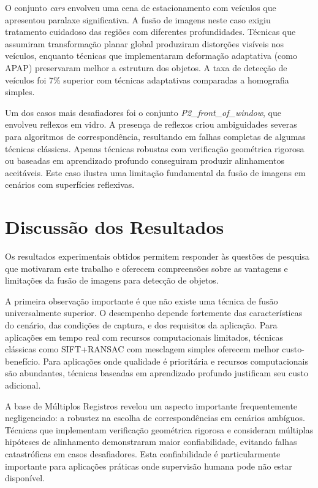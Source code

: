 O conjunto \textit{cars} envolveu uma cena de estacionamento com veículos que apresentou paralaxe significativa. A fusão de imagens neste caso exigiu tratamento cuidadoso das regiões com diferentes profundidades. Técnicas que assumiram transformação planar global produziram distorções visíveis nos veículos, enquanto técnicas que implementaram deformação adaptativa (como APAP) preservaram melhor a estrutura dos objetos. A taxa de detecção de veículos foi 7\% superior com técnicas adaptativas comparadas a homografia simples.

Um dos casos mais desafiadores foi o conjunto \textit{P2\_front\_of\_window}, que envolveu reflexos em vidro. A presença de reflexos criou ambiguidades severas para algoritmos de correspondência, resultando em falhas completas de algumas técnicas clássicas. Apenas técnicas robustas com verificação geométrica rigorosa ou baseadas em aprendizado profundo conseguiram produzir alinhamentos aceitáveis. Este caso ilustra uma limitação fundamental da fusão de imagens em cenários com superfícies reflexivas.

\section{Discussão dos Resultados}

Os resultados experimentais obtidos permitem responder às questões de pesquisa que motivaram este trabalho e oferecem compreensões sobre as vantagens e limitações da fusão de imagens para detecção de objetos.

A primeira observação importante é que não existe uma técnica de fusão universalmente superior. O desempenho depende fortemente das características do cenário, das condições de captura, e dos requisitos da aplicação. Para aplicações em tempo real com recursos computacionais limitados, técnicas clássicas como SIFT+RANSAC com mesclagem simples oferecem melhor custo-benefício. Para aplicações onde qualidade é prioritária e recursos computacionais são abundantes, técnicas baseadas em aprendizado profundo justificam seu custo adicional.

A base de Múltiplos Registros revelou um aspecto importante frequentemente negligenciado: a robustez na escolha de correspondências em cenários ambíguos. Técnicas que implementam verificação geométrica rigorosa e consideram múltiplas hipóteses de alinhamento demonstraram maior confiabilidade, evitando falhas catastróficas em casos desafiadores. Esta confiabilidade é particularmente importante para aplicações práticas onde supervisão humana pode não estar disponível.

